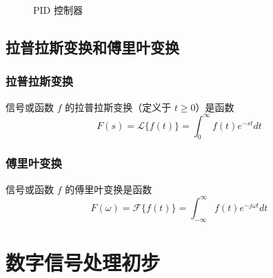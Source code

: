 \documentclass{ctexbeamer}
\begin{document}
\begin{frame}
\begin{figure}
{
			}
			\caption{PID 控制器}
		\end{figure}
	\end{frame}

	\subsection{拉普拉斯变换和傅里叶变换}

	\begin{frame}
		\frametitle{拉普拉斯变换}
		\begin{definition}[拉普拉斯变换]
			信号或函数 $f$ 的拉普拉斯变换（定义于 $t \geq 0$）是函数 $$F(s) = \mathcal{L}\{f(t)\} = \int_0^{\infty} f(t)e^{-st} dt$$
		\end{definition}
		\begin{figure}[width=\linewidth]
			
		\end{figure}
	\end{frame}

	\begin{frame}
		\frametitle{傅里叶变换}
		\begin{definition}[傅里叶变换]
			信号或函数 $f$ 的傅里叶变换是函数 $$F(\omega) = \mathcal{F}\{f(t)\} = \int_{-\infty}^{\infty} f(t)e^{-j\omega t} dt$$
		\end{definition}
		\begin{figure}[width=\linewidth]
			
		\end{figure}
	\end{frame}

	\section{数字信号处理初步}
\end{document}
